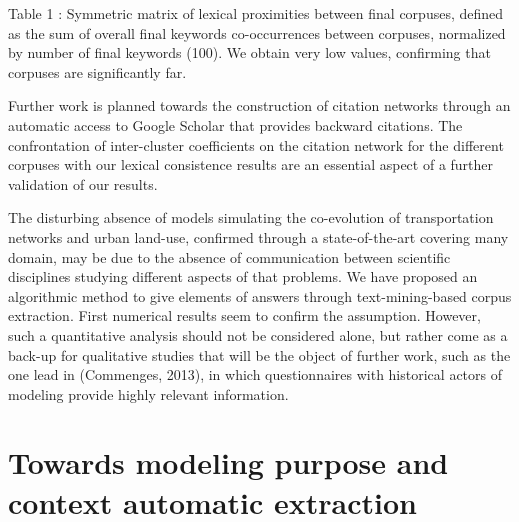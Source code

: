 Table 1 : Symmetric matrix of lexical proximities between final corpuses, defined as the sum of overall final keywords co-occurrences between corpuses, normalized by number of final keywords (100). We obtain very low values, confirming that corpuses are significantly far.


Further work is planned towards the construction of citation networks through an automatic access to Google Scholar that provides backward citations. The confrontation of inter-cluster coefficients on the citation network for the different corpuses with our lexical consistence results are an essential aspect of a further validation of our results.


The disturbing absence of models simulating the co-evolution of transportation networks and urban land-use, confirmed through a state-of-the-art covering many domain, may be due to the absence of communication between scientific disciplines studying different aspects of that problems. We have proposed an algorithmic method to give elements of answers through text-mining-based corpus extraction. First numerical results seem to confirm the assumption. However, such a quantitative analysis  should not be considered alone, but rather come as a back-up for qualitative studies that will be the object of further work, such as the one lead in (Commenges, 2013), in which questionnaires with historical actors of modeling provide highly relevant information.










\section{Towards modeling purpose and context automatic extraction}






